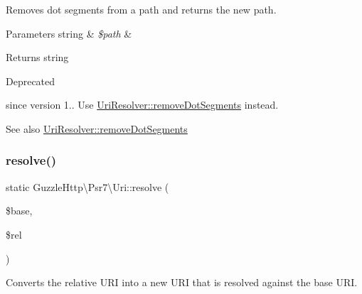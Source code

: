 Removes dot segments from a path and returns the new path.


\begin{DoxyParams}[1]{Parameters}
string & {\em \$path} & \\
\hline
\end{DoxyParams}
\begin{DoxyReturn}{Returns}
string
\end{DoxyReturn}
\begin{DoxyRefDesc}{Deprecated}
\item[\hyperlink{deprecated__deprecated000002}{Deprecated}]since version 1.. Use \hyperlink{classGuzzleHttp_1_1Psr7_1_1UriResolver_a9a9fc1515e4db2b3fcb089190c04c731}{Uri\+Resolver\+::remove\+Dot\+Segments} instead. \end{DoxyRefDesc}
\begin{DoxySeeAlso}{See also}
\hyperlink{classGuzzleHttp_1_1Psr7_1_1UriResolver_a9a9fc1515e4db2b3fcb089190c04c731}{Uri\+Resolver\+::remove\+Dot\+Segments} 
\end{DoxySeeAlso}
\mbox{\label{classGuzzleHttp_1_1Psr7_1_1Uri_a2830373f1802a9f4381be81a3f008c5b}} 
\subsubsection{\texorpdfstring{resolve()}{resolve()}}
{\footnotesize\ttfamily static Guzzle\+Http\textbackslash{}\+Psr7\textbackslash{}\+Uri\+::resolve (\begin{DoxyParamCaption}\item[{\hyperlink{interfacePsr_1_1Http_1_1Message_1_1UriInterface}{Uri\+Interface}}]{\$base,  }\item[{}]{\$rel }\end{DoxyParamCaption})\hspace{0.3cm}{\ttfamily [static]}}

Converts the relative U\+RI into a new U\+RI that is resolved against the base U\+RI.



